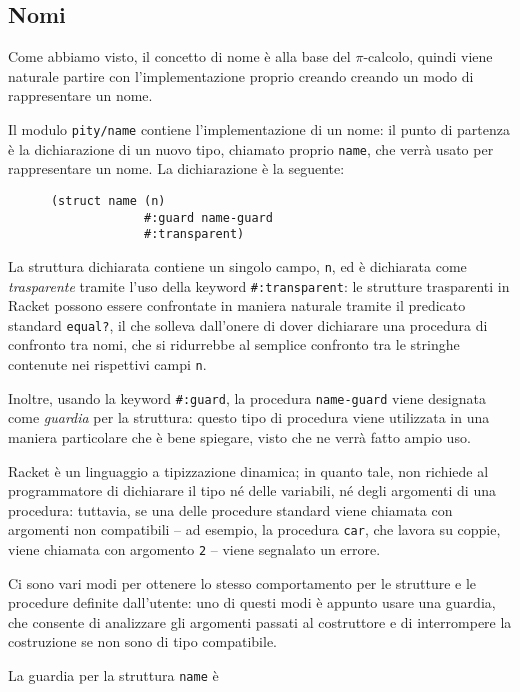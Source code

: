 \subsection{Nomi}

Come abbiamo visto, il concetto di nome \`e alla base del $\pi$-calcolo,
quindi viene naturale partire con l'implementazione proprio creando creando
un modo di rappresentare un nome.

Il modulo \lstinline{pity/name} contiene l'implementazione di un nome: il
punto di partenza \`e la dichiarazione di un nuovo tipo, chiamato proprio
\lstinline{name}, che verr\`a usato per rappresentare un nome. La
dichiarazione \`e la seguente:

\begin{lstlisting}
      (struct name (n)
                   #:guard name-guard
                   #:transparent)
\end{lstlisting}

La struttura dichiarata contiene un singolo campo, \lstinline{n}, ed \`e
dichiarata come \emph{trasparente} tramite l'uso della keyword
\lstinline{#:transparent}: le strutture trasparenti in Racket possono essere
confrontate in maniera naturale tramite il predicato standard
\lstinline{equal?}, il che solleva dall'onere di dover dichiarare una
procedura di confronto tra nomi, che si ridurrebbe al semplice confronto
tra le stringhe contenute nei rispettivi campi \lstinline{n}.

Inoltre, usando la keyword \lstinline{#:guard}, la procedura
\lstinline{name-guard} viene designata come \emph{guardia} per la struttura:
questo tipo di procedura viene utilizzata in una maniera particolare che \`e
bene spiegare, visto che ne verr\`a fatto ampio uso.

Racket \`e un linguaggio a tipizzazione dinamica; in quanto tale, non
richiede al programmatore di dichiarare il tipo n\'e delle variabili, n\'e
degli argomenti di una procedura: tuttavia, se una delle procedure standard
viene chiamata con argomenti non compatibili -- ad esempio, la procedura
\lstinline{car}, che lavora su coppie, viene chiamata con argomento
\lstinline{2} --  viene segnalato un errore.

Ci sono vari modi per ottenere lo stesso comportamento per le strutture e
le procedure definite dall'utente: uno di questi modi \`e appunto usare una
guardia, che consente di analizzare gli argomenti passati al costruttore e
di interrompere la costruzione se non sono di tipo compatibile.

La guardia per la struttura \lstinline{name} \`e

